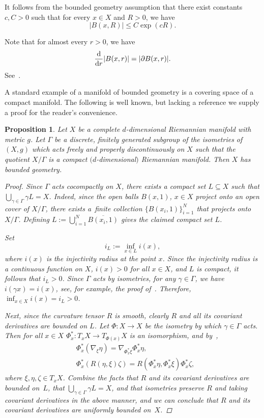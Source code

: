 \documentclass[pdftex]{sigma}
\numberwithin{equation}{section}
\newtheorem{Proposition}[Theorem]{Proposition}
 { \theoremstyle{definition}
\newtheorem{Definition}[Theorem]{Definition}
\newtheorem{Note}[Theorem]{Note}
\newtheorem{Example}[Theorem]{Example}
\newtheorem{Remark}[Theorem]{Remark} }
\begin{document}
\begin{Remark}
 It follows from the bounded geometry assumption that there exist constants $c,C>0$ such that for every $x\in X$ and $R>0$, we have
 \[
 |B(x,R)| \leq C\exp(cR).
 \]
\end{Remark}

Note that for almost every $r>0$, we have
\[
 \frac{{\rm d}}{{\rm d}r}|B(x,r)| = |\partial B(x,r)|.
\]
See~\cite[Propositions III.3.2 and~III.5.1]{Chavel2006}.

A standard example of a manifold of bounded geometry is a covering space of a compact manifold. The following is well known, but lacking a reference we supply a proof for the reader's convenience.
\begin{Proposition}
Let $X$ be a complete $d$-dimensional Riemannian manifold with metric $g$. Let $\Gamma$ be a discrete, finitely generated subgroup of the isometries of $(X,g)$ which acts freely and properly discontinuously on $X$ such that the quotient $X/\Gamma$ is a compact $(d$-dimensional$)$ Riemannian manifold. Then $X$ has bounded geometry.
\begin{proof}
Since $\Gamma$ acts cocompactly on $X$, there exists a compact set $L \!\subseteq\! X$ such that  ${\bigcup_{\gamma \in \Gamma} \gamma L \!=\! X}$. Indeed, since the open balls $B(x, 1)$, $x\in X$ project onto an open cover of $X/\Gamma$, there exists a~finite collection $\{ B(x_i,1)\}_{i=1}^N$ that projects onto $X/\Gamma$. Defining $L := \bigcup_{i=1}^N \overline{B(x_i,1)}$ gives the claimed compact set $L$.

Set \[i_L := \inf_{x \in L} i(x), \]
where $i(x)$ is the injectivity radius at the point $x$. Since the injectivity radius is a continuous function on $X$, $i(x)>0$ for all $x\in X$, and $L$ is compact, it follows that $i_L > 0$. Since $\Gamma$ acts by isometries, for any $\gamma \in \Gamma$, we have $i(\gamma x) = i(x)$, see, for example, the proof of~\cite[Theorem~III.5.4]{Sakai1996}. Therefore, $\inf_{x\in X} i(x) = i_L >0$.

Next, since the curvature tensor $R$ is smooth, clearly $R$ and all its covariant derivatives are bounded on $L$. Let $\Phi\colon X \to X$ be the isometry by which $\gamma \in \Gamma$ acts. Then for all $x\in X$ $\Phi_x^*\colon T_xX \to T_{\Phi(x)}X$ is an isomorphism, and by~\cite[p.~41]{Sakai1996},
\begin{align*}
 &\Phi_x^*(\nabla_{\xi}\eta)= \nabla_{\Phi_x^*\xi} \Phi_x^*\eta,\\
 &\Phi_x^*(R(\eta, \xi)\zeta)= R(\Phi_x^*\eta, \Phi_x^*\xi)\Phi_x^*\zeta,
\end{align*}
where $\xi, \eta, \zeta \in T_xX$. Combine the facts that $R$ and its covariant derivatives are bounded on~$L$, that $\bigcup_{\gamma \in \Gamma} \gamma L = X$, and that isometries preserve $R$ and taking covariant derivatives in the above manner, and we can conclude that $R$ and its covariant derivatives are uniformly bounded on~$X$.
\end{proof}
\end{Proposition}
\end{document}

